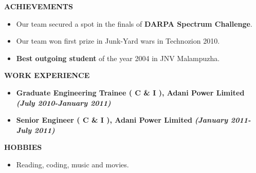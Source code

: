 \documentclass[a4paper,10pt]{article}
\begin{document}
 \colorbox{titleColor}{\parbox{6.5in}{\textbf{ACHIEVEMENTS}}}

 \begin{itemize}
 \item Our team secured a spot in the finals of \textbf{DARPA Spectrum Challenge}.
 \item Our team won first prize in Junk-Yard wars in Technozion 2010.
 \item \textbf{Best outgoing student} of the year 2004 in JNV Malampuzha.
  \end{itemize}

  \colorbox{titleColor}{\parbox{6.5in}{\textbf{WORK EXPERIENCE}}}

    \begin{itemize}
      \setlength{\itemsep}{1pt}
      \item \textbf{Graduate Engineering Trainee ( C \& I ), Adani Power Limited}  \textbf \emph{(July 2010-January 2011)}
      \item \textbf{Senior Engineer ( C \& I ), Adani Power Limited}  \textbf \emph{(January 2011-July 2011)}
    \end{itemize}
    
\colorbox{titleColor}{\parbox{6.5in}{\textbf{HOBBIES}}}

\begin{itemize}
 \setlength{\itemsep}{1pt}
    \item Reading, coding, music and movies.
  \end{itemize}
\end{document}

